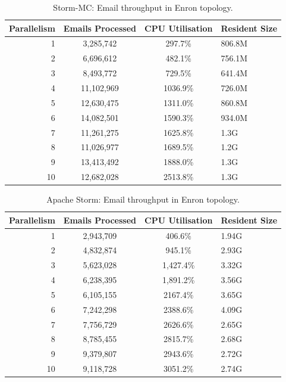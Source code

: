\documentclass[bsc,deptreport,twoside,singlespacing,normalheadings,parskip]{infthesis}\usepackage[]{graphicx}\usepackage[]{color}
\begin{document}
\begin{table}[!htb]
\begin{adjustwidth}{-0.5in}{-0.5in}
\centering
\small
\begin{tabular}{@{}rccl@{}}
    \textbf{Parallelism} & \textbf{Emails Processed} & \textbf{CPU Utilisation} & \textbf{Resident Size} \\ \toprule
    1 & {3,285,742} & {297.7\%} & {806.8M} \\
    2 & {6,696,612} & {482.1\%} & {756.1M} \\
    3 & {8,493,772} & {729.5\%} & {641.4M} \\
    4 & {11,102,969} & {1036.9\%} & {726.0M} \\
    5 & {12,630,475} & {1311.0\%} & {860.8M} \\
    6 & {14,082,501} & {1590.3\%} & {934.0M} \\
    7 & {11,261,275} & {1625.8\%} & {1.3G} \\
    8 & {11,026,977} & {1689.5\%} & {1.2G} \\
    9 & {13,413,492} & {1888.0\%} & {1.3G} \\
    10 & {12,682,028} & {2513.8\%} & {1.3G} \\
\end{tabular}
\caption{Storm-MC: Email throughput in Enron topology.}
\label{table:storm_mc_enron}
\end{adjustwidth}
\end{table}

\begin{table}[!htb]
\begin{adjustwidth}{-0.5in}{-0.5in}
\centering
\small
\begin{tabular}{@{}rccl@{}}
    \textbf{Parallelism} & \textbf{Emails Processed} & \textbf{CPU Utilisation} & \textbf{Resident Size} \\ \toprule
    1 & {2,943,709} & {406.6\%} & {1.94G} \\
    2 & {4,832,874} & {945.1\%} & {2.93G} \\
    3 & {5,623,028} & {1,427.4\%} & {3.32G} \\
    4 & {6,238,395} & {1,891.2\%} & {3.56G} \\
    5 & {6,105,155} & {2167.4\%} & {3.65G} \\
    6 & {7,242,298} & {2388.6\%} & {4.09G} \\
    7 & {7,756,729} & {2626.6\%} & {2.65G} \\
    8 & {8,785,455} & {2815.7\%} & {2.68G} \\
    9 & {9,379,807} & {2943.6\%} & {2.72G} \\
    10 & {9,118,728} & {3051.2\%} & {2.74G} \\
\end{tabular}
\caption{Apache Storm: Email throughput in Enron topology.}
\label{table:storm_enron}
\end{adjustwidth}
\end{table}
\end{document}
